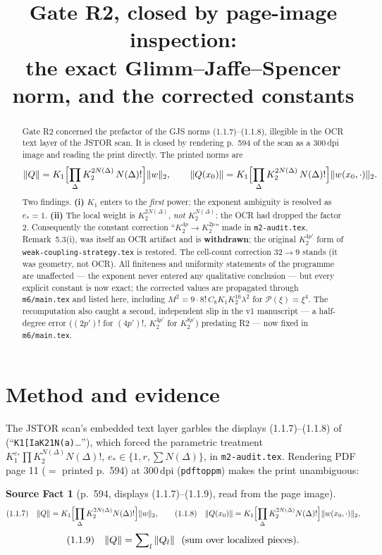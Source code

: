 \documentclass[11pt,a4paper]{article}
\title{Gate R2, closed by page-image inspection:\\
\large the exact Glimm--Jaffe--Spencer norm, and the corrected constants}
\author{}
\date{}
\theoremstyle{plain}
\theoremstyle{definition}
\newtheorem{srcfact}[theorem]{Source Fact}
\begin{document}
\maketitle

\begin{abstract}
Gate R2 concerned the prefactor of the GJS norms (1.1.7)--(1.1.8), illegible in the OCR text
layer of the JSTOR scan. It is closed by rendering p.~594 of the scan as a 300\,dpi image and
reading the print directly. The printed norms are
\[
  \|Q\|=K_1\Bigl[\prod_\Delta K_2^{2N(\Delta)}\,N(\Delta)!\Bigr]\|w\|_2,
  \qquad
  \|Q(x_0)\|=K_1\Bigl[\prod_\Delta K_2^{2N(\Delta)}\,N(\Delta)!\Bigr]\|w(x_0,\cdot)\|_2 .
\]
Two findings. \textbf{(i)} $K_1$ enters to the \emph{first} power; the exponent ambiguity is
resolved as $e_*=1$. \textbf{(ii)} The local weight is $K_2^{2N(\Delta)}$, \emph{not}
$K_2^{N(\Delta)}$: the OCR had dropped the factor $2$. Consequently the constant correction
``$K_2^{4p}\to K_2^{2p}$'' made in \texttt{m2-audit.tex}, Remark~5.3(i), was itself an OCR
artifact and is \textbf{withdrawn}; the original $K_2^{4p'}$ form of
\texttt{weak-coupling-strategy.tex} is restored. The cell-count correction $32\to9$ stands
(it was geometry, not OCR). All finiteness and uniformity statements of the programme are
unaffected --- the exponent never entered any qualitative conclusion --- but every explicit
constant is now exact; the corrected values are propagated through \texttt{m6/main.tex} and
listed here, including $M^2=9\cdot8!\,C_8K_1K_2^{16}\lambda^2$ for
$\mathscr P(\xi)=\xi^4$. The recomputation also caught a second, independent slip in the v1
manuscript --- a half-degree error ($(2p')!$ for $(4p')!$, $K_2^{4p'}$ for $K_2^{8p'}$) predating
R2 --- now fixed in \texttt{m6/main.tex}.
\end{abstract}

\section{Method and evidence}

The JSTOR scan's embedded text layer garbles the displays (1.1.7)--(1.1.8) of \cite{GJS}
(``\texttt{K1[IaK21N(a)}\dots''), which forced the parametric treatment
$K_1^{e_*}\prod K_2^{N(\Delta)}N(\Delta)!$, $e_*\in\{1,r,\sum N(\Delta)\}$, in
\texttt{m2-audit.tex}. Rendering PDF page 11 ($=$ printed p.~594) at 300\,dpi
(\texttt{pdftoppm}) makes the print unambiguous:

\begin{srcfact}[p.~594, displays (1.1.7)--(1.1.9), read from the page image]\label{sf:norm}
\[
  \textup{(1.1.7)}\quad
  \|Q\|=K_1\Bigl[\prod_\Delta K_2^{2N(\Delta)}N(\Delta)!\Bigr]\|w\|_2,
  \qquad
  \textup{(1.1.8)}\quad
  \|Q(x_0)\|=K_1\Bigl[\prod_\Delta K_2^{2N(\Delta)}N(\Delta)!\Bigr]\|w(x_0,\cdot)\|_2,
\]
\[
  \textup{(1.1.9)}\quad \|Q\|=\sum\nolimits_l\|Q_l\|\ \ \text{(sum over localized pieces)} .
\]
\end{srcfact}
\end{document}
